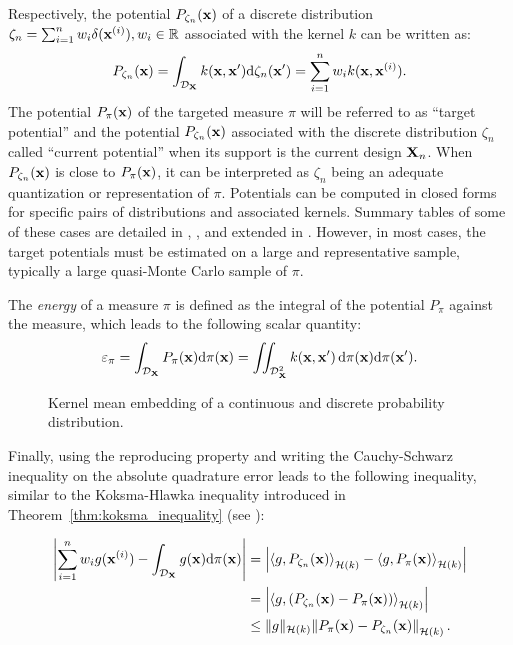 Respectively, the potential $P_{\zeta_n}({\bf x})$ of a discrete distribution $\zeta_n = \sum_{i=1}^{n} w_i \delta({\bf x}^{(i)}), w_i \in \mathbb{R}$ associated with the kernel $k$ can be written as:
\begin{equation}\label{eq:potential}
    P_{\zeta_n}({\bf x}) =  \int_{\mathcal{D}_{{\bf X}}} k({\bf x}, {\bf x}') \mathrm{d} \zeta_n({\bf x}') = \sum_{i=1}^{n} w_i k({\bf x}, {\bf x}^{(i)}).
\end{equation}
The potential $P_{\pi}({\bf x})$ of the targeted measure $\pi$ will be referred to as ``target potential'' and the potential $P_{\zeta_n}({\bf x})$ associated with the discrete distribution $\zeta_n$ called ``current potential'' when its support is the current design ${\bf X}_n$. 
When $P_{\zeta_n}({\bf x})$ is close to $P_{\pi}({\bf x})$, it can be interpreted as $\zeta_n$ being an adequate quantization or representation of $\pi$. %
Potentials can be computed in closed forms for specific pairs of distributions and associated kernels. 
Summary tables of some of these cases are detailed in \cite[Sec. 3.4]{briol_phd_2019}, \cite[Sec. 4]{pronzato_zhigljavsky_2020}, and extended in \cite{fekhari_iooss_2023}. 
However, in most cases, the target potentials must be estimated on a large and representative sample, typically a large quasi-Monte Carlo sample of $\pi$.


The \emph{energy} of a measure $\pi$ is defined as the integral of the potential $P_\pi$ against the measure, which leads to the following scalar quantity:
\begin{equation}
    \varepsilon_\pi= \int_{\mathcal{D}_{{\bf X}}} P_{\pi}({\bf x}) \mathrm{d} \pi({\bf x}) = \iint_{\mathcal{D}_{{\bf X}}^2} k({\bf x}, {\bf x}')\, \mathrm{d}\pi({\bf x}) \mathrm{d}\pi({\bf x}').
\end{equation}
\label{eq:target_energy}

\begin{figure}
    \centering
    
    \caption{Kernel mean embedding of a continuous and discrete probability distribution.}
    \label{fig:kernel_mean_embedding}
\end{figure}
Finally, using the reproducing property and writing the Cauchy-Schwarz inequality on the absolute quadrature error leads to the following inequality, similar to the Koksma-Hlawka inequality introduced in Theorem~\ref{thm:koksma_inequality} (see \citealp{briol_oates_2019}): 

\begin{subequations}
\begin{align}
    \left| \sum_{i=1}^{n} w_i g({\bf x}^{(i)}) - \int_{\mathcal{D}_{{\bf X}}} g({\bf x}) \mathrm{d} \pi({\bf x}) \right| &= \left| \left\langle g, P_{\zeta_n}({\bf x}) \right\rangle_{\mathcal{H}(k)} - \left\langle g, P_{\pi}({\bf x}) \right\rangle_{\mathcal{H}(k)} \right| \\
    &= \left| \left\langle g, \left(P_{\zeta_n}({\bf x}) - P_{\pi}({\bf x})\right) \right\rangle_{\mathcal{H}(k)} \right|\\
    &\leq \lVert g \lVert_{\mathcal{H}(k)}  \left\lVert P_{\pi}({\bf x}) - P_{\zeta_n}({\bf x}) \right\lVert_{\mathcal{H}(k)}.
    \label{eq:quad_error}
\end{align}
\end{subequations}

